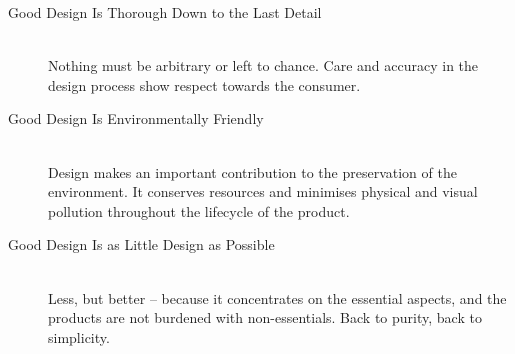 \documentclass[letterpaper]{article}
\begin{document}
\begin{description}
\item[Good Design Is Thorough Down to the Last Detail] \hfill \\
Nothing must be arbitrary or left to chance. Care and accuracy in the design process show respect towards the consumer.

\item[Good Design Is Environmentally Friendly] \hfill \\
Design makes an important contribution to the preservation of the environment. It conserves resources and minimises physical and visual pollution throughout the lifecycle of the product.

\item[Good Design Is as Little Design as Possible] \hfill \\
Less, but better -- because it concentrates on the essential aspects, and the products are not burdened with non-essentials. Back to purity, back to simplicity.

\end{description}
\end{document}
